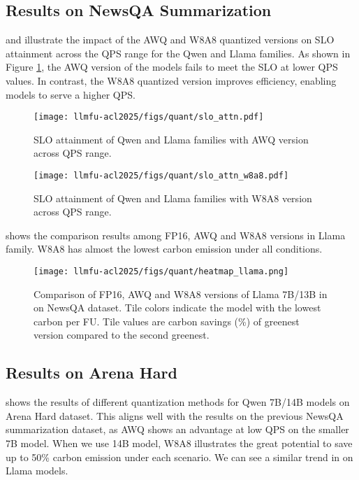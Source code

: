 \subsection{Results on NewsQA Summarization}
 and  illustrate the impact of the AWQ and W8A8 quantized versions on SLO attainment across the QPS range for the Qwen and Llama families. As shown in Figure \ref{fig:quant_slo_awq}, the AWQ version of the models fails to meet the SLO at lower QPS values. In contrast, the W8A8 quantized version improves efficiency, enabling models to serve a higher QPS.

\begin{figure}[!t]
    \centering
    \texttt{[image: llmfu-acl2025/figs/quant/slo\_attn.pdf]}
    \caption{SLO attainment of Qwen and Llama families with AWQ version across QPS range.}
    \label{fig:quant_slo_awq}
\end{figure}

\begin{figure}[!t]
    \centering
    \texttt{[image: llmfu-acl2025/figs/quant/slo\_attn\_w8a8.pdf]}
    \caption{SLO attainment of Qwen and Llama families with W8A8 version across QPS range.}
    \label{fig:quant_slo_w8a8}
\end{figure}

 shows the comparison results among FP16, AWQ and W8A8 versions in Llama family. W8A8 has almost the lowest carbon emission under all conditions. 


\begin{figure}[!t]
    \centering
    \texttt{[image: llmfu-acl2025/figs/quant/heatmap\_llama.png]}
    \caption{Comparison of FP16, AWQ and W8A8 versions of Llama 7B/13B in \SYSTEM{} on NewsQA dataset. Tile colors indicate the model with the lowest carbon per FU. Tile values are carbon savings (\%) of greenest version compared to the second greenest.}
    \label{fig:quant_newsqa_llama_heatmap}
\end{figure}

\subsection{Results on Arena Hard}
 shows the results of different quantization methods for Qwen 7B/14B models on Arena Hard dataset. This aligns well with the results on the previous NewsQA summarization dataset, as AWQ shows an advantage at low QPS on the smaller 7B model. When we use 14B model, W8A8 illustrates the great potential to save up to 50\% carbon emission under each scenario. We can see a similar trend in  on Llama models. 
 
